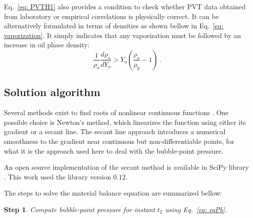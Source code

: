 \documentclass[authoryear,preprint,review,11pt]{elsarticle}
\newtheorem{step}{Step}
\begin{document}
Eq.~\eqref{eq: PVTH1} also provides a condition to check whether PVT data obtained from laboratory or empirical correlations is physically correct. It can be alternatively formulated in terms of densities as shown bellow in Eq.~\eqref{eq: vaporization}. It simply indicates that any vaporization must be followed by an increase in oil phase density:
\begin{equation}\label{eq: vaporization}
\frac{1}{\rho_o}\frac{d\rho_o}{dY_o} > Y_o \left( \frac{\rho_o}{\rho_g} - 1 \right) \, .
\end{equation}



\subsection{Solution algorithm}
Several methods exist to find roots of nonlinear continuous functions \citep{hamming1987numerical}. One possible choice is Newton's method, which linearizes the function using either its gradient or a secant line. The secant line approach introduces a numerical smoothness to the gradient near continuous but non-differentiable points, for what it is the approach used here to deal with the bubble-point pressure.

An open source implementation of the secant method is available in SciPy library \citep{scipy}. This work used the library version $0.12$.




The steps to solve the material balance equation are summarized bellow:
\begin{step}
Compute bubble-point pressure for instant $t_2$ using Eq.~\eqref{eq: eqPb}.
\end{step}
\end{document}
